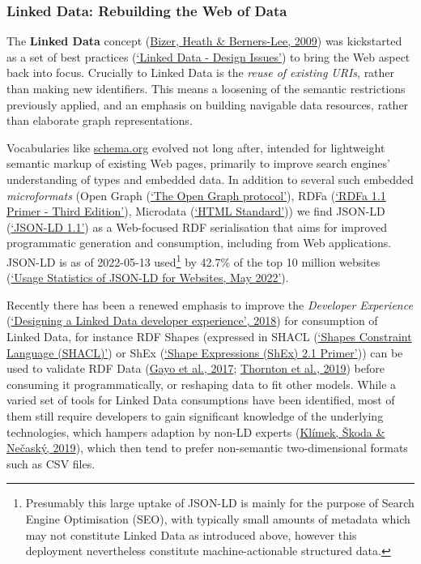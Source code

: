 \hypertarget{sec:ld-web}{%
\subsubsection{Linked Data: Rebuilding the Web of Data}\label{sec:ld-web}}

The \textbf{Linked Data} concept (\protect\hyperlink{ref-19s3yyxDn}{Bizer, Heath \& Berners-Lee, 2009}) was kickstarted as a set of best practices (\protect\hyperlink{ref-OGXYtGZ8}{{`Linked Data - Design Issues'}}) to bring the Web aspect back into focus. Crucially to Linked Data is the \emph{reuse of existing URIs}, rather than making new identifiers. This means a loosening of the semantic restrictions previously applied, and an emphasis on building navigable data resources, rather than elaborate graph representations.

Vocabularies like \href{https://schema.org/}{schema.org} evolved not long after, intended for lightweight semantic markup of existing Web pages, primarily to improve search engines' understanding of types and embedded data. In addition to several such embedded \emph{microformats} (Open Graph (\protect\hyperlink{ref-oN9D5LkD}{{`The Open Graph protocol'}}), RDFa (\protect\hyperlink{ref-FKIF6ApB}{{`RDFa 1.1 Primer - Third Edition'}}), Microdata (\protect\hyperlink{ref-14Utscfe4}{{`HTML Standard'}})) we find JSON-LD (\protect\hyperlink{ref-X5SWPqSU}{{`JSON-LD 1.1'}}) as a Web-focused RDF serialisation that aims for improved programmatic generation and consumption, including from Web applications. JSON-LD is as of 2022-05-13 used\footnote{Presumably this large uptake of JSON-LD is mainly for the purpose of Search Engine Optimisation (SEO), with typically small amounts of metadata which may not constitute Linked Data as introduced above, however this deployment nevertheless constitute machine-actionable structured data.} by 42.7\% of the top 10 million websites (\protect\hyperlink{ref-j3SqQLBR}{{`Usage Statistics of JSON-LD for Websites, May 2022'}}).

Recently there has been a renewed emphasis to improve the \emph{Developer Experience} (\protect\hyperlink{ref-BFMoe8FC}{{`Designing a Linked Data developer experience'}, 2018}) for consumption of Linked Data, for instance RDF Shapes (expressed in SHACL (\protect\hyperlink{ref-GDrm9dgX}{{`Shapes Constraint Language (SHACL)'}}) or ShEx (\protect\hyperlink{ref-YUzogaV}{{`Shape Expressions (ShEx) 2.1 Primer'}})) can be used to validate RDF Data (\protect\hyperlink{ref-ZeOAPNHa}{Gayo et al., 2017}; \protect\hyperlink{ref-S5BI6Mwx}{Thornton et al., 2019}) before consuming it programmatically, or reshaping data to fit other models. While a varied set of tools for Linked Data consumptions have been identified, most of them still require developers to gain significant knowledge of the underlying technologies, which hampers adaption by non-LD experts (\protect\hyperlink{ref-o596f2JM}{Klímek, Škoda \& Nečaský, 2019}), which then tend to prefer non-semantic two-dimensional formats such as CSV files.

